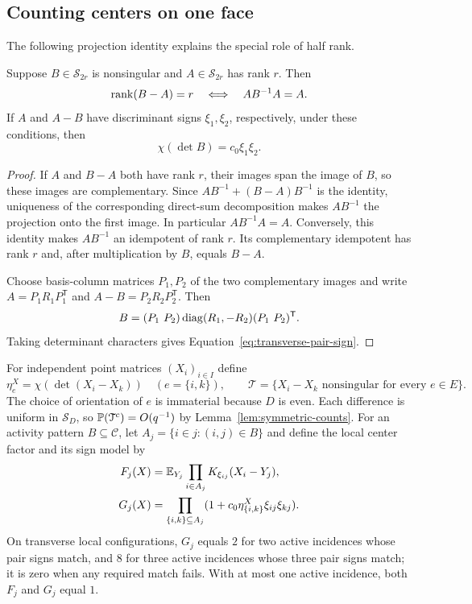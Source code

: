 \subsection{Counting centers on one face}

The following projection identity explains the special role of half
rank.

\begin{lemma}
\label{lem:transverse-projection}
Suppose $B\in\mathcal S_{2r}$ is nonsingular and $A\in\mathcal S_{2r}$
has rank $r$. Then
\begin{equation}
\label{eq:transverse-projection}
 \rank(B-A)=r\quad\Longleftrightarrow\quad AB^{-1}A=A.
\end{equation}
If $A$ and $A-B$ have discriminant signs $\xi_1,\xi_2$, respectively,
under these conditions, then
\begin{equation}
\label{eq:transverse-pair-sign}
 \chi(\det B)=c_0\xi_1\xi_2.
\end{equation}
\end{lemma}

\begin{proof}
If $A$ and $B-A$ both have rank $r$, their images span the image of
$B$, so these images are complementary. Since
$AB^{-1}+(B-A)B^{-1}$ is the identity, uniqueness of the corresponding
direct-sum decomposition makes $AB^{-1}$ the projection onto the first
image. In particular $AB^{-1}A=A$. Conversely, this identity makes
$AB^{-1}$ an idempotent of rank $r$. Its complementary idempotent has
rank $r$ and, after multiplication by $B$, equals $B-A$.

Choose basis-column matrices $P_1,P_2$ of the two complementary images
and write $A=P_1R_1P_1^{\mathsf T}$ and
$A-B=P_2R_2P_2^{\mathsf T}$. Then
\[
 B=(P_1\ P_2)\diag(R_1,-R_2)(P_1\ P_2)^{\mathsf T}.
\]
Taking determinant characters gives
Equation~\eqref{eq:transverse-pair-sign}.
\end{proof}

For independent point matrices $(X_i)_{i\in I}$ define
\begin{equation}
\label{eq:transverse-event}
 \eta_e^X=\chi(\det(X_i-X_k))\quad(e=\{i,k\}),\qquad
 \mathcal T=\{X_i-X_k\text{ nonsingular for every }e\in E\}.
\end{equation}
The choice of orientation of $e$ is immaterial because $D$ is even.
Each difference is uniform in $\mathcal S_D$, so
$\P(\mathcal T^c)=O(q^{-1})$ by Lemma~\ref{lem:symmetric-counts}.
For an activity pattern $B\subseteq\mathscr C$, let
$A_j=\{i\in j:(i,j)\in B\}$ and define the local center factor and its
sign model by
\begin{align}
 F_j(X)&=\E_{Y_j}\prod_{i\in A_j}K_{\xi_{ij}}(X_i-Y_j),
 \label{eq:transverse-face-factor}\\
 G_j(X)&=\prod_{\{i,k\}\subseteq A_j}
       (1+c_0\eta^X_{\{i,k\}}\xi_{ij}\xi_{kj}).
 \label{eq:transverse-model}
\end{align}
On transverse local configurations, $G_j$ equals $2$ for two active
incidences whose pair signs match, and $8$ for three active incidences
whose three pair signs match; it is zero when any required match fails.
With at most one active incidence, both $F_j$ and $G_j$ equal $1$.


